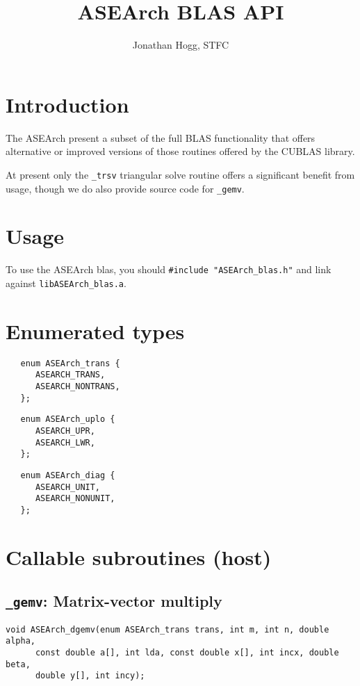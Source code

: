 \documentclass{article}
\begin{document}
\title{ASEArch BLAS API}
\author{Jonathan Hogg, STFC}
\maketitle

\tableofcontents
\newpage

\section{Introduction}
The ASEArch present a subset of the full BLAS functionality that offers
alternative or improved versions of those routines offered by the CUBLAS
library.

\noindent
At present only the \texttt{\_trsv} triangular solve routine offers a
significant benefit from usage, though we do also provide source code for
\texttt{\_gemv}.

\section{Usage}
To use the ASEArch blas, you should \texttt{\#include "ASEArch\_blas.h"}
and link against \texttt{libASEArch\_blas.a}.

\section{Enumerated types}

\begin{verbatim}
   enum ASEArch_trans {
      ASEARCH_TRANS,
      ASEARCH_NONTRANS,
   };
\end{verbatim}

\begin{verbatim}
   enum ASEArch_uplo {
      ASEARCH_UPR,
      ASEARCH_LWR,
   };
\end{verbatim}

\begin{verbatim}
   enum ASEArch_diag {
      ASEARCH_UNIT,
      ASEARCH_NONUNIT,
   };
\end{verbatim}

\section{Callable subroutines (host)}
\subsection{\texttt{\_gemv}: Matrix-vector multiply}
\begin{verbatim}
void ASEArch_dgemv(enum ASEArch_trans trans, int m, int n, double alpha,
      const double a[], int lda, const double x[], int incx, double beta,
      double y[], int incy);
\end{verbatim}
\end{document}
